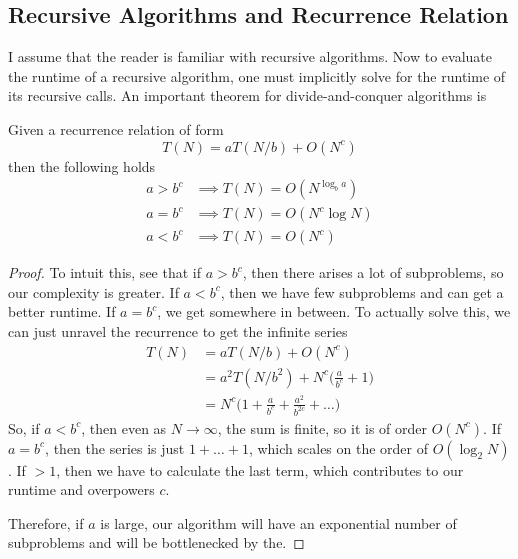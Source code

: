 \documentclass{article}
\begin{document}
  \subsection{Recursive Algorithms and Recurrence Relation}

    I assume that the reader is familiar with recursive algorithms. Now to evaluate the runtime of a recursive algorithm, one must implicitly solve for the runtime of its recursive calls. An important theorem for divide-and-conquer algorithms is 

    \begin{theorem}
      Given a recurrence relation of form 
      \begin{equation}
        T(N) = a T(N/b) + O(N^c)
      \end{equation}
      then the following holds 
      \begin{align}
        a > b^c & \implies T(N) = O(N^{\log_b a}) \\
        a = b^c & \implies T(N) = O(N^c \log{N}) \\
        a < b^c & \implies T(N) = O(N^c) 
      \end{align}
    \end{theorem}
    \begin{proof}
      To intuit this, see that if $a > b^c$, then there arises a lot of subproblems, so our complexity is greater. If $a < b^c$, then we have few subproblems and can get a better runtime. If $a = b^c$, we get somewhere in between. To actually solve this, we can just unravel the recurrence to get the infinite series 
      \begin{align}
        T(N) & = a T(N/b) + O(N^c) \\
             & = a^2 T(N/b^2) +  N^c \bigg( \frac{a}{b^c} + 1 \bigg) \\
             & =  N^c \bigg( 1 + \frac{a}{b^c} + \frac{a^2}{b^{2c}} + \ldots \bigg)
      \end{align}
      So, if $a < b^c$, then even as $N \rightarrow \infty$, the sum is finite, so it is of order $O(N^c)$. If $a = b^c$, then the series is just $1 + \ldots + 1$, which scales on the order of $O(\log_2 {N})$. If $> 1$, then we have to calculate the last term, which contributes to our runtime and overpowers $c$.  
      
      Therefore, if $a$ is large, our algorithm will have an exponential number of subproblems and will be bottlenecked by the. 
    \end{proof}
\end{document}
